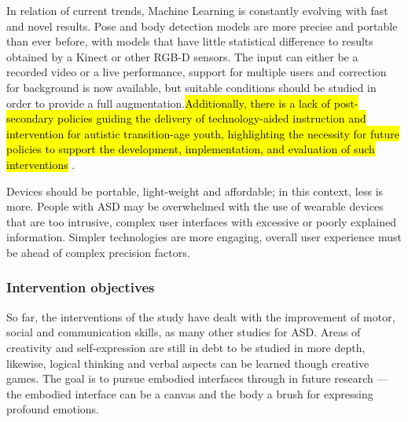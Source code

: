 \documentclass[a4paper,fleqn]{cas-sc}
\begin{document}
In relation of current trends, Machine Learning is constantly evolving with fast and novel results. Pose and body detection models are more precise and portable than ever before, with models that have little statistical difference to results obtained by a Kinect or other RGB-D sensors. The input can either be a recorded video or a live performance, support for multiple users and correction for background is now available, but suitable conditions should be studied in order to provide a full augmentation.\hl{Additionally, there is a lack of post-secondary policies guiding the delivery of technology-aided instruction and intervention for autistic transition-age youth, highlighting the necessity for future policies to support the development, implementation, and evaluation of such interventions} \cite{Sherwood24}.

Devices should be portable, light-weight and affordable; in this context, less is more. People with ASD may be overwhelmed with the use of wearable devices that are too intrusive, complex user interfaces with excessive or poorly explained information. Simpler technologies are more engaging, overall user experience must be ahead of complex precision factors.

\subsubsection{Intervention objectives}

So far, the interventions of the study have dealt with the improvement of motor, social and communication skills, as many other studies for ASD. Areas of creativity and self-expression are still in debt to be studied in more depth, likewise, logical thinking and verbal aspects can be learned though creative games. The goal is to pursue embodied interfaces through in future research — the embodied interface can be a canvas and the body a brush for expressing profound emotions.
\end{document}
